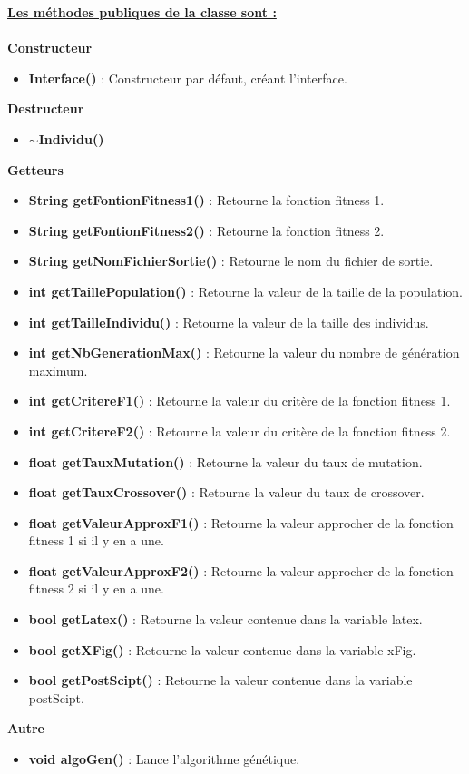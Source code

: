 \documentclass[a4paper,11pt]{article}
\begin{document}
			\underline{\bf Les méthodes publiques de la classe sont :}\\\\
			\textbf{Constructeur}
				\begin{itemize}
					\item \textbf{Interface()} : Constructeur par défaut, créant l'interface.\\
					\end{itemize}
			\textbf{Destructeur}
				\begin{itemize}
					\item \textbf{$\sim$Individu()}\\
				\end{itemize}
			\textbf{Getteurs}
				\begin{itemize}
					\item \textbf{String getFontionFitness1()} : Retourne la fonction fitness 1.
					\item \textbf{String getFontionFitness2()} : Retourne la fonction fitness 2.
					\item \textbf{String getNomFichierSortie()} : Retourne le nom du fichier de sortie.
					\item \textbf{int getTaillePopulation()} : Retourne la valeur de la taille de la population.
					\item \textbf{int getTailleIndividu()} : Retourne la valeur de la taille des individus.
					\item \textbf{int getNbGenerationMax()} : Retourne la valeur du nombre de génération maximum.
					\item \textbf{int getCritereF1()} : Retourne la valeur du critère de la fonction fitness 1.
					\item \textbf{int getCritereF2()} : Retourne la valeur du critère de la fonction fitness 2.
					\item \textbf{float getTauxMutation()} : Retourne la valeur du taux de mutation.
					\item \textbf{float getTauxCrossover()} : Retourne la valeur du taux de crossover.
					\item \textbf{float getValeurApproxF1()} : Retourne la valeur approcher de la fonction fitness 1 si il y en a une.
					\item \textbf{float getValeurApproxF2()} : Retourne la valeur approcher de la fonction fitness 2 si il y en a une.
					\item \textbf{bool getLatex()} : Retourne la valeur contenue dans la variable latex.
					\item \textbf{bool getXFig()} : Retourne la valeur contenue dans la variable  xFig.
					\item \textbf{bool getPostScipt()} : Retourne la valeur contenue dans la variable  postScipt.\\
				\end{itemize}
			\textbf{Autre}
				\begin{itemize}
					\item \textbf{void algoGen()} : Lance l'algorithme génétique.
				\end{itemize}
		
\end{document}
